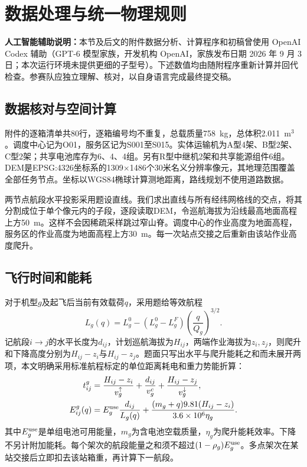 \section{数据处理与统一物理规则}

\noindent\textbf{人工智能辅助说明：}本节及后文的附件数据分析、计算程序和初稿曾使用 OpenAI Codex 辅助（GPT-6 模型家族，开发机构 OpenAI，家族发布日期 2026 年 9 月 3 日；本次运行环境未提供更细的子型号）。下述数值均由随附程序重新计算并回代检查。参赛队应独立理解、核对，以自身语言完成最终提交稿。

\subsection{数据核对与空间计算}

附件的逐箱清单共80行，逐箱编号均不重复，总载质量758~kg，总体积2.011~m$^3$。调度中心记为O01，服务区记为S001至S015。实体运输机为A型4架、B型2架、C型2架；共享电池库存为6、4、4组。另有R型中继机2架和共享能源组件6组。DEM是EPSG:4326坐标系的1309$\times$1486个30米名义分辨率像元，其地理范围覆盖全部任务节点。坐标以WGS84椭球计算测地距离，路线规划不使用道路数据。

两节点航段水平投影采用题设直线。我们求出直线与所有经纬网格线的交点，将其分割成位于单个像元内的子段，逐段读取DEM，令巡航海拔为沿线最高地面高程上方50~m。这样不会因稀疏采样跳过窄山脊。调度中心的作业高度为地面高程，服务区的作业高度为地面高程上方30~m。每一次站点交接之后重新由该站作业高度爬升。

\subsection{飞行时间和能耗}

对于机型$g$及起飞后当前有效载荷$q$，采用题给等效航程
\begin{equation}
L_g(q)=L_g^0-(L_g^0-L_g^F)\left(\frac{q}{Q_g}\right)^{3/2}.
\label{eq:range}
\end{equation}
记航段$i\to j$的水平长度为$d_{ij}$，计划巡航海拔为$H_{ij}$，两端作业海拔为$z_i,z_j$，则爬升和下降高度分别为$H_{ij}-z_i$与$H_{ij}-z_j$。题面只写出水平与爬升能耗之和而未展开两项，本文明确采用标准航程标定的单位距离耗电和重力势能折算：
\begin{align}
t^g_{ij}&=\frac{H_{ij}-z_i}{v_g^\uparrow}+\frac{d_{ij}}{v_g^c}+\frac{H_{ij}-z_j}{v_g^\downarrow},\\
E^g_{ij}(q)&=E_g^{\rm use}\frac{d_{ij}}{L_g(q)}+\frac{(m_g+q)9.81(H_{ij}-z_i)}{3.6\times10^6\eta_g}.
\label{eq:energy}
\end{align}
其中$E_g^{\rm use}$是单组电池可用能量，$m_g$为含电池空载质量，$\eta_g$为爬升能耗效率。下降不另计附加能耗。每个架次的航段能量之和须不超过$(1-\rho_g)E_g^{\rm use}$。多点架次在某站交接后立即扣去该站箱重，再计算下一航段。

